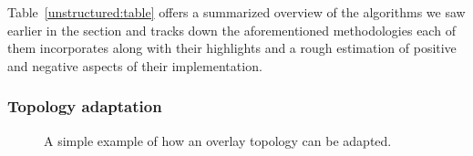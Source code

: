 Table~\ref{unstructured:table} offers a summarized overview of the algorithms
we saw earlier in the section and tracks down the aforementioned methodologies
each of them incorporates along with their highlights and a rough estimation of
positive and negative aspects of their implementation.

\subsubsection{Topology adaptation}
\begin{figure}[ht]
\centering
{}\qquad\qquad
{}
\caption{A simple example of how an overlay topology can be adapted.}
\label{figure:topology-adaptation}
\end{figure}

